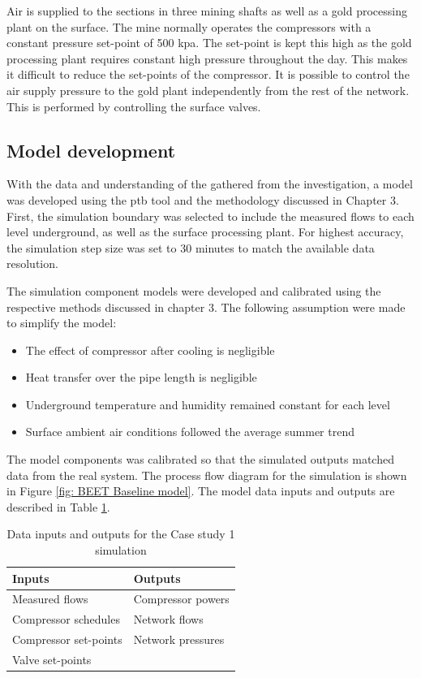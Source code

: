 \par
Air is supplied to the sections in three mining shafts as well as a gold processing plant on the surface. The mine normally operates the compressors with a constant pressure set-point of 500 \gls{kpa}.  The set-point is kept this high as the gold processing plant requires constant high pressure throughout the day. This makes it difficult to reduce the set-points of the compressor. It is possible to control the air supply pressure to the gold plant independently from the rest of the network. This is performed by controlling the surface valves.

\subsection{Model development}
With the data and understanding of the gathered from the investigation, a model was developed using the \gls{ptb} tool and the methodology discussed in Chapter 3. First, the simulation boundary was selected to include the measured flows to each level underground, as well as the surface processing plant. For highest accuracy, the simulation step size was set to 30 minutes to match the available data resolution.
\par
The simulation component models were developed and calibrated using the respective methods discussed in chapter 3. The following assumption were  made to simplify the model:
\begin{itemize}
	\item The effect of compressor after cooling is negligible
	\item Heat transfer over the pipe length is negligible
	\item Underground temperature and humidity remained constant for each level
	\item Surface ambient air conditions followed the average summer trend
\end{itemize} 
The model components was calibrated so that the simulated outputs matched data from the real system. The process flow diagram for the simulation is shown in Figure \ref{fig: BEET Baseline model}. The model data inputs and outputs are described in Table \ref{table: Mine A inputs/outputs}.

\begin{table}[h]
	\centering
	\begin{tabular}{ll}
		\hline
		Inputs \hspace*{4cm}    &Outputs \hspace*{4cm}    \\  \hline
		Measured flows&Compressor powers \\
		Compressor schedules& Network flows \\
		Compressor set-points& Network pressures \\
		Valve set-points&  \\
		\hline
	\end{tabular}
	\caption{Data inputs and outputs for the Case study 1 simulation }
	\label{table: Mine A inputs/outputs}
\end{table}

